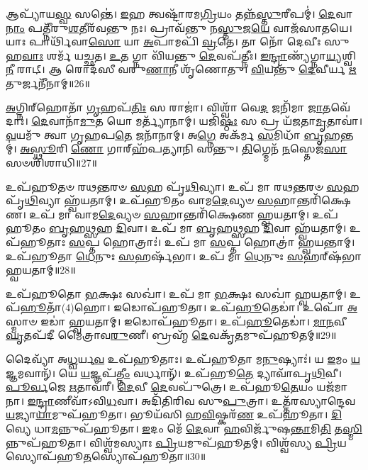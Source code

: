 𑌆𑌪𑍍𑌯𑌾᳴𑌯\-\ul{𑌸𑍍𑌵} 𑌸𑌨𑍍𑌤𑍇॑।
\-\ul{𑌇}\-𑌹 𑌤𑍍𑌵𑌷𑍍𑌟𑌾᳴𑌰𑌮\-\ul{𑌗𑍍𑌰𑌿}\-𑌯𑌂 𑌤𑌨𑍍𑌨᳴\-\ul{𑌸𑍍𑌤𑍁}\-𑌰𑍀𑌪𑌮𑍍॑।
\-\ul{𑌦𑍇}\-𑌵𑌾\-\ul{𑌨𑌾𑌂} 𑌪𑌤𑍍𑌨𑍀᳴𑌰𑍁\-\ul{𑌶}\-𑌤𑍀𑌰᳴𑌵𑌨𑍍𑌤𑍁 𑌨𑌃।
𑌪𑍍𑌰𑌾𑌵᳴𑌨𑍍𑌤𑍁 𑌨\-\ul{𑌸𑍍𑌤𑍁}\-𑌜\-\ul{𑌯𑍇} 𑌵𑌾𑌜᳴𑌸𑌾𑌤𑌯𑍇।
𑌯𑌾𑌃 𑌪𑌾𑌰𑍍𑌥𑌿᳴𑌵𑌾\-\ul{𑌸𑍋} 𑌯𑌾 \ul{𑌅}\-𑌪𑌾𑌮𑌪𑌿᳴ \ul{𑌵𑍍𑌰}\-𑌤𑍇।
𑌤𑌾 𑌨𑍋᳴ 𑌦𑍇𑌵𑍀𑌃 𑌸𑍁𑌹\-\ul{𑌵𑌾𑌃} 𑌶𑌰𑍍𑌮᳴ 𑌯𑌚𑍍𑌛𑌤।
\-\ul{𑌉}\-𑌤 𑌗𑍍𑌨𑌾 𑌵𑌿᳴𑌯𑌨𑍍𑌤𑍁 \ul{𑌦𑍇}\-𑌵𑌪᳴𑌤𑍍𑌨𑍀𑌃।
\-\ul{𑌇}\-\-\ul{𑌨𑍍𑌦𑍍𑌰𑌾}\-𑌣𑍍𑌯᳴𑌗𑍍𑌨𑌾\-\ul{𑌯𑍍𑌯}\-𑌶𑍍𑌵𑌿\-\ul{𑌨𑍀} 𑌰𑌾𑌟𑍍।
𑌆 𑌰𑍋𑌦᳴𑌸𑍀 𑌵𑌰𑍁\-\ul{𑌣𑌾}\-𑌨𑍀 𑌶𑍃᳴𑌣𑍋𑌤𑍁।
\-\ul{𑌵𑌿}\-𑌯𑌨𑍍𑌤𑍁᳴ \ul{𑌦𑍇}\-𑌵𑍀𑌰𑍍𑌯 \ul{𑌋}\-𑌤𑍁𑌰𑍍𑌜𑌨𑍀᳴𑌨𑌾𑌮𑍍॥26॥

\-\ul{𑌅}\-𑌗𑍍𑌨𑌿𑌰𑍍‌\mbox{}𑌹𑍋𑌤𑌾᳴ \ul{𑌗𑍃}\-𑌹𑌪᳴\-\ul{𑌤𑌿𑌃} 𑌸 𑌰𑌾𑌜𑌾॑।
𑌵𑌿𑌶𑍍𑌵𑌾᳴ 𑌵𑍇\-\ul{𑌦} 𑌜𑌨𑌿᳴𑌮𑌾 \ul{𑌜𑌾}\-𑌤𑌵𑍇᳴𑌦𑌾𑌃।
\-\ul{𑌦𑍇}\-𑌵𑌾𑌨𑌾᳴\-\ul{𑌮𑍁}\-𑌤 𑌯𑍋 𑌮𑌰𑍍𑌤𑍍𑌯𑌾᳴𑌨𑌾𑌮𑍍।
𑌯𑌜𑌿᳴\-\ul{𑌷𑍍𑌠𑌃} 𑌸 𑌪𑍍𑌰 𑌯᳴𑌜𑌤𑌾\-\ul{𑌮𑍃}\-𑌤𑌾𑌵𑌾॑।
\-\ul{𑌵}\-𑌯𑌮𑍁᳴ 𑌤𑍍𑌵𑌾 𑌗𑍃𑌹𑌪\-\ul{𑌤𑍇} 𑌜𑌨𑌾᳴𑌨𑌾𑌮𑍍।
𑌅\-\ul{𑌗𑍍𑌨𑍇} 𑌅𑌕᳴𑌰𑍍𑌮 \ul{𑌸}\-𑌮𑌿𑌧𑌾᳴ \ul{𑌬𑍃}\-𑌹𑌨𑍍𑌤𑌮𑍍॑।
\-\ul{𑌅}\-\-\ul{𑌸𑍍𑌥𑍂}\-𑌰𑌿 \ul{𑌣𑍋} 𑌗𑌾𑌰𑍍‌\mbox{}𑌹᳴𑌪𑌤𑍍𑌯𑌾𑌨𑌿 𑌸𑌨𑍍𑌤𑍁।
\-\ul{𑌤𑌿}\-𑌗𑍍𑌮𑍇𑌨᳴ \ul{𑌨}\-𑌸𑍍𑌤𑍇𑌜᳴\-\ul{𑌸𑌾} 𑌸𑍞𑌶𑌿᳴𑌶𑌾𑌧𑌿॥27॥\anuvakamend[𑌜𑌨𑍀᳴𑌨𑌾\-\ul{𑌮}\-𑌷𑍍𑌟𑍗 𑌚᳴]

𑌉𑌪᳴𑌹𑍂𑌤𑍞 𑌰𑌥\-\ul{𑌨𑍍𑌤}\-𑌰𑍞 \ul{𑌸}\-𑌹 𑌪𑍃᳴\-\ul{𑌥𑌿}\-𑌵𑍍𑌯𑌾।
𑌉𑌪᳴ 𑌮𑌾 𑌰𑌥\-\ul{𑌨𑍍𑌤}\-𑌰𑍞 \ul{𑌸}\-𑌹 𑌪𑍃᳴\-\ul{𑌥𑌿}\-𑌵𑍍𑌯𑌾 𑌹𑍍𑌵᳴𑌯𑌤𑌾𑌮𑍍।
𑌉𑌪᳴𑌹𑍂𑌤𑌂 𑌵𑌾𑌮\-\ul{𑌦𑍇}\-𑌵𑍍𑌯𑍞 \ul{𑌸}\-𑌹𑌾𑌨𑍍𑌤𑌰𑌿᳴𑌕𑍍𑌷𑍇𑌣।
𑌉𑌪᳴ 𑌮𑌾 𑌵𑌾𑌮\-\ul{𑌦𑍇}\-𑌵𑍍𑌯𑍞 \ul{𑌸}\-𑌹𑌾𑌨𑍍𑌤𑌰𑌿᳴𑌕𑍍𑌷𑍇𑌣 𑌹𑍍𑌵𑌯𑌤𑌾𑌮𑍍।
𑌉𑌪᳴𑌹𑍂𑌤𑌂 \ul{𑌬𑍃}\-𑌹\-\ul{𑌥𑍍𑌸}\-𑌹 \ul{𑌦𑌿}\-𑌵𑌾।
𑌉𑌪᳴ 𑌮𑌾 \ul{𑌬𑍃}\-𑌹\-\ul{𑌥𑍍𑌸}\-𑌹 \ul{𑌦𑌿}\-𑌵𑌾 𑌹𑍍𑌵᳴𑌯𑌤𑌾𑌮𑍍।
𑌉𑌪᳴𑌹𑍂𑌤𑌾𑌃 \ul{𑌸}\-𑌪𑍍𑌤 𑌹𑍋𑌤𑍍𑌰𑌾𑌃॑।
𑌉𑌪᳴ 𑌮𑌾 \ul{𑌸}\-𑌪𑍍𑌤 𑌹𑍋𑌤𑍍𑌰𑌾॑ 𑌹𑍍𑌵𑌯𑌨𑍍𑌤𑌾𑌮𑍍।
𑌉𑌪᳴𑌹𑍂𑌤𑌾 \ul{𑌧𑍇}\-𑌨𑍁𑌃 \ul{𑌸}\-𑌹𑌰𑍍\mbox{}𑌷᳴𑌭𑌾।
𑌉𑌪᳴ 𑌮𑌾 \ul{𑌧𑍇}\-𑌨𑍁𑌃 \ul{𑌸}\-𑌹𑌰𑍍‌\mbox{}𑌷᳴𑌭𑌾 𑌹𑍍𑌵𑌯𑌤𑌾𑌮𑍍॥28॥

𑌉𑌪᳴𑌹𑍂𑌤𑍋 \ul{𑌭}\-𑌕𑍍𑌷𑌃 𑌸𑌖𑌾॑।
𑌉𑌪᳴ 𑌮𑌾 \ul{𑌭}\-𑌕𑍍𑌷𑌃 𑌸𑌖𑌾॑ 𑌹𑍍𑌵𑌯𑌤𑌾𑌮𑍍।
𑌉𑌪᳴\-\ul{𑌹𑍂}\-𑌤𑌾𑌁(4)𑌹𑍋।
𑌇𑌡𑍋𑌪᳴𑌹𑍂𑌤𑌾।
𑌉𑌪᳴\-\ul{𑌹𑍂}\-𑌤𑍇𑌡𑌾॑।
𑌉𑌪𑍋᳴ \ul{𑌅}\-𑌸𑍍𑌮𑌾𑍞 𑌇𑌡𑌾॑ 𑌹𑍍𑌵𑌯𑌤𑌾𑌮𑍍।
𑌇𑌡𑍋𑌪᳴𑌹𑍂𑌤𑌾।
𑌉𑌪᳴\-\ul{𑌹𑍂}\-𑌤𑍇𑌡𑌾॑।
\-\ul{𑌮𑌾}\-\-\ul{𑌨}\-𑌵𑍀 \ul{𑌘𑍃}\-𑌤𑌪᳴𑌦𑍀 𑌮𑍈𑌤𑍍𑌰𑌾𑌵\-\ul{𑌰𑍁}\-𑌣𑍀।
𑌬𑍍𑌰𑌹𑍍𑌮᳴ \ul{𑌦𑍇}\-𑌵𑌕𑍃᳴\-\ul{𑌤}\-𑌮𑍁𑌪᳴𑌹𑍂𑌤𑌮𑍍॥29॥

𑌦𑍈𑌵𑍍𑌯𑌾᳴ 𑌅\-\ul{𑌧𑍍𑌵}\-𑌰𑍍𑌯\-\ul{𑌵} 𑌉𑌪᳴𑌹𑍂𑌤𑌾𑌃।
𑌉𑌪᳴𑌹𑍂𑌤𑌾 𑌮\-\ul{𑌨𑍁}\-𑌷𑍍𑌯𑌾𑌃॑।
𑌯 \ul{𑌇}\-𑌮𑌂 \ul{𑌯}\-𑌜𑍍𑌞𑌮𑌵𑌾𑌨𑍍᳴।
𑌯𑍇 \ul{𑌯}\-𑌜𑍍𑌞𑌪᳴\-\ul{𑌤𑍍𑌨𑍀𑌂} 𑌵𑌰𑍍𑌧𑌾𑌨𑍍᳴।
𑌉𑌪᳴𑌹𑍂\-\ul{𑌤𑍇} 𑌦𑍍𑌯𑌾𑌵𑌾᳴𑌪𑍃\-\ul{𑌥𑌿}\-𑌵𑍀।
\-\ul{𑌪𑍂}\-\-\ul{𑌰𑍍𑌵}\-𑌜𑍇 \ul{𑌋}\-𑌤𑌾𑌵᳴𑌰𑍀।
\-\ul{𑌦𑍇}\-𑌵𑍀 \ul{𑌦𑍇}\-𑌵𑌪𑍁᳴𑌤𑍍𑌰𑍇।
𑌉𑌪᳴𑌹𑍂\-\ul{𑌤𑍇}\-𑌯𑌂 𑌯𑌜᳴𑌮𑌾𑌨𑌾।
\-\ul{𑌇}\-\-\ul{𑌨𑍍𑌦𑍍𑌰𑌾}\-𑌣𑍀𑌵𑌾᳴\-𑌽𑌵𑌿\-\ul{𑌧}\-𑌵𑌾।
𑌅𑌦𑌿᳴𑌤𑌿𑌰𑌿𑌵 𑌸𑍁\-\ul{𑌪𑍁}\-𑌤𑍍𑌰𑌾।
𑌉𑌤𑍍𑌤᳴𑌰𑌸𑍍𑌯𑌾𑌨𑍍𑌦𑍇𑌵\-\ul{𑌯}\-𑌜𑍍𑌯𑌾\-\ul{𑌯𑌾}\-𑌮𑍁𑌪᳴𑌹𑍂𑌤𑌾।
𑌭𑍂𑌯᳴𑌸𑌿 𑌹\-\ul{𑌵𑌿}\-𑌷𑍍𑌕𑌰᳴\-\ul{𑌣} 𑌉𑌪᳴𑌹𑍂𑌤𑌾।
\-\ul{𑌦𑌿}\-𑌵𑍍𑌯𑍇 𑌧𑌾\-\ul{𑌮}\-𑌨𑍍𑌨𑍁𑌪᳴𑌹𑍂𑌤𑌾।
\-\ul{𑌇}\-𑌦𑌂 𑌮𑍇᳴ \ul{𑌦𑍇}\-𑌵𑌾 \ul{𑌹}\-𑌵𑌿𑌰𑍍𑌜𑍁᳴𑌷\-\ul{𑌨𑍍𑌤𑌾}\-𑌮𑌿\-\ul{𑌤𑌿} 𑌤\-\ul{𑌸𑍍𑌮𑌿}\-𑌨𑍍𑌨𑍁𑌪᳴𑌹𑍂𑌤𑌾।
𑌵𑌿𑌶𑍍𑌵᳴𑌮𑌸𑍍𑌯𑌾𑌃 \ul{𑌪𑍍𑌰𑌿}\-𑌯𑌮𑍁𑌪᳴𑌹𑍂𑌤𑌮𑍍।
𑌵𑌿𑌶𑍍𑌵᳴𑌸𑍍𑌯 \ul{𑌪𑍍𑌰𑌿}\-𑌯𑌸𑍍𑌯𑍋𑌪᳴𑌹𑍂\-\ul{𑌤}\-𑌸𑍍𑌯𑍋𑌪᳴𑌹𑍂𑌤𑌾॥30॥\anuvakamend[\-\ul{𑌸}\-𑌹𑌰𑍍\mbox{}𑌷᳴𑌭𑌾 𑌹𑍍𑌵𑌯\-\ul{𑌤𑌾}\-𑌮𑍁𑌪᳴𑌹𑍂𑌤𑍞 𑌸𑍁\-\ul{𑌪𑍁}\-𑌤𑍍𑌰𑌾 𑌷𑌟𑍍𑌚᳴]




